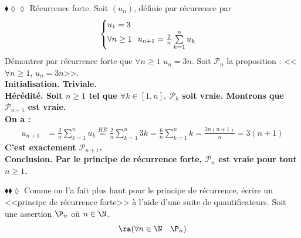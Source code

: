 \documentclass[11pt]{article}
\begin{document}
\vspace*{-0.8cm}

\begin{exercice}{$\blacklozenge\lozenge\lozenge$ Récurrence forte.}{}
    Soit $(u_n)$, définie par récurrence par
    \begin{equation*}
        \begin{cases}
            u_1 = 3\\
            \forall{n\geq1} \hspace{0.25cm} u_{n+1}= \frac{2}{n}\sum\limits^{n}_{k=1}{u_k}
        \end{cases}
    \end{equation*}
    Démontrer par récurrence forte que $\forall{n\geq1}$ $u_n=3n$.
    \tcblower
    Soit $\mathcal{P}_n$ la proposition : <<$\forall{n\geq1}$, $u_n=3n$>>.\\
    \bf{Initialisation.} Triviale.\\
    \bf{Hérédité.} Soit $n\geq1$ tel que $\forall k\in[1,n], ~ \mathcal{P}_k$ soit vraie. Montrons que $\mathcal{P}_{n+1}$ est vraie.\\
    On a :
    \begin{align*}
        u_{n+1} 
        &= \frac{2}{n}\sum^{n}_{k=1}{u_k}
        \stackrel{HR}{=} \frac{2}{n}\sum^{n}_{k=1}{3k}
        = \frac{6}{n}\sum^{n}_{k=1}{k}
        = \frac{3n(n+1)}{n}
        = 3(n+1)
    \end{align*}
    C'est exactement $\mathcal{P}_{n+1}$.\\
    \bf{Conclusion.} Par le principe de récurrence forte, $\mathcal{P}_n$ est vraie pour tout $n\geq1$.
\end{exercice}

\begin{exercice}{$\blacklozenge\blacklozenge\lozenge$}{}
    Comme on l'a fait plus haut pour le principe de récurrence, écrire un <<principe de récurrence forte>> à l'aide d'une suite de quantificateurs.
    \tcblower
    Soit une assertion $\P_n$ où $n\in\N$.
    \begin{equation*}
        [\forall n \in \N \quad  \left( \forall k \in \lb 0, n \rb \quad \P_k \right) \Rightarrow \P_{n+1}] \ra (\forall n \in \N \quad \P_n)
    \end{equation*}
\end{exercice}
\end{document}
